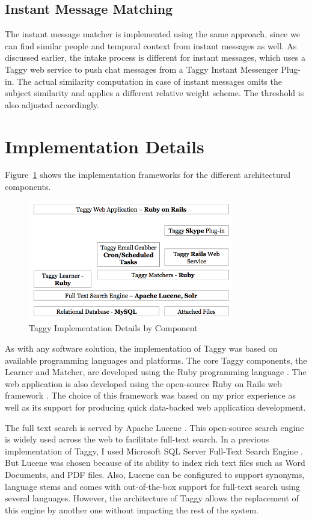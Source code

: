 \subsection{Instant Message Matching}
The instant message matcher is implemented using the same approach, since we can find similar people and temporal context from instant messages as well. As discussed earlier, the intake process is different for instant messages, which uses a Taggy web service to push chat messages from a Taggy Instant Messenger Plug-in. The actual similarity computation in case of instant messages omits the subject similarity and applies a different relative weight scheme. The threshold is also adjusted accordingly.

\section{Implementation Details}
Figure~\ref{fig:implementation} shows the implementation frameworks for the different architectural components.


\begin{figure}[!h]
	\centering
	\includegraphics[width=0.8\textwidth]{Implementation.png}
    \caption{Taggy Implementation Details by Component}
	\label{fig:implementation}
\end{figure}



As with any software solution, the implementation of Taggy was based on available programming languages and platforms. The core Taggy components, the Learner and Matcher, are developed using the Ruby programming language \cite{ruby}. The web application is also developed using the open-source Ruby on Rails web framework \cite{ruby_on_rails}. The choice of this framework was based on my prior experience as well as its support for producing quick data-backed web application development.

The full text search is served by Apache Lucene \cite{lucene}. This open-source search engine is widely used across the web to facilitate full-text search. In a previous implementation of Taggy, I used Microsoft SQL Server Full-Text Search Engine \cite{auto_tagging, sql_server}. But Lucene was chosen because of its ability to index rich text files such as Word Documents, and PDF files. Also, Lucene can be configured to support synonyms, language stems and comes with out-of-the-box support for full-text search using several languages. However, the architecture of Taggy allows the replacement of this engine by another one without impacting the rest of the system.


